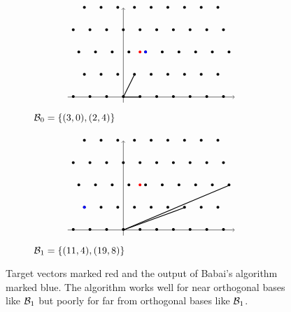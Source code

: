 \documentclass[a4paper,12pt]{article}
\begin{document}
\begin{figure}[H]
    \centering
    \begin{subfigure}{.5\textwidth}
        $$
        \begin{tikzpicture}[scale=0.2]
        \draw[->, thin] (-10,0)--(20,0) node [right] {}; 
        \draw[->, thin] (0,-1)--(0,16) node [above] {};
        \foreach \Point in {(-9,0), (-6,0), (-3,0), (0,0), (3,0), (6,0), (9,0), (12,0), (15,0), (18,0), (-7,4), (-4,4), (-1,4), (2,4), (5,4), (8,4), (11,4), (14,4), (17,4), (-8,8), (-5,8), (-2,8), (1,8), (4,8), (7,8), (10,8), (13,8), (16,8), (19,8), (-9,12), (-6,12), (-3,12), (0,12), (3,12), (6,12), (9,12), (12,12), (15,12), (18,12), (-7,16), (-4,16), (-1,16), (2,16), (5,16), (8,16), (11,16), (14,16), (17,16)}{
            \node at \Point {\textbullet};    
        }
        \node[color=red] at (3,8) {\textbullet};
        \node[color=blue] at (4,8) {\textbullet};
        \draw[thick] (0,0)--(3,0);
        \draw[thick] (0,0)--(2,4);
        \end{tikzpicture}
        $$
        \caption{$\mathcal{B}_0 = \lbrace (3,0), (2,4) \rbrace$}
    \end{subfigure}%
    \begin{subfigure}{.5\textwidth}
        $$
        \begin{tikzpicture}[scale=0.2]
        \draw[->, thin] (-10,0)--(20,0) node [right] {}; 
        \draw[->, thin] (0,-1)--(0,16) node [above] {};
        \foreach \Point in {(-9,0), (-6,0), (-3,0), (0,0), (3,0), (6,0), (9,0), (12,0), (15,0), (18,0), (-7,4), (-4,4), (-1,4), (2,4), (5,4), (8,4), (11,4), (14,4), (17,4), (-8,8), (-5,8), (-2,8), (1,8), (4,8), (7,8), (10,8), (13,8), (16,8), (19,8), (-9,12), (-6,12), (-3,12), (0,12), (3,12), (6,12), (9,12), (12,12), (15,12), (18,12), (-7,16), (-4,16), (-1,16), (2,16), (5,16), (8,16), (11,16), (14,16), (17,16)}{
            \node at \Point {\textbullet};    
        }
        \node[color=red] at (3,8) {\textbullet};
        \node[color=blue] at (-7,4) {\textbullet};
        \draw[thick] (0,0)--(19,8);
        \draw[thick] (0,0)--(11,4);
        \end{tikzpicture}
        $$
        \caption{$\mathcal{B}_1 = \lbrace (11,4), (19,8) \rbrace$} 
    \end{subfigure}%
    \caption{Target vectors marked red and the output of Babai's algorithm marked blue. The algorithm works well for near orthogonal bases like $\mathcal{B}_1$ but poorly for far from orthogonal bases like $\mathcal{B}_1$.}
\end{figure}
\end{document}
